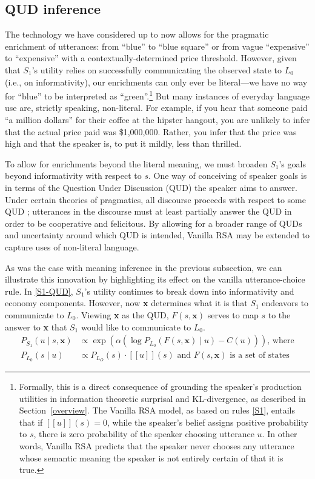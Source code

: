 \documentclass{sp}
\newcommand{\sem}[1]{\ensuremath{[\![#1]\!]}}
\begin{document}
\subsection{QUD inference}

The technology we have considered up to now allows for the pragmatic enrichment of utterances: from ``blue'' to ``blue square'' or from vague ``expensive'' to ``expensive'' with a contextually-determined price threshold. However, given that $S_1$'s utility relies on successfully communicating the observed state to $L_0$ (i.e., on informativity), our enrichments can only ever be literal---we have no way for ``blue'' to be interpreted as ``green''.\footnote{
  Formally, this is a direct consequence of grounding the speaker's production utilities in information theoretic surprisal and KL-divergence, as described in Section~\ref{overview}. The Vanilla RSA model, as based on rules \eqref{S1}, entails that if $\sem{u}(s)=0$, while the speaker's belief assigns positive probability to $s$, there is zero probability of the speaker choosing utterance $u$. In other words, Vanilla RSA predicts that the speaker never chooses any utterance whose semantic meaning the speaker is not entirely certain of that it is true.
}
But many instances of everyday language use are, strictly speaking, non-literal. For example, if you hear that someone paid ``a million dollars'' for their coffee at the hipster hangout, you are unlikely to infer that the actual price paid was \$1,000,000. Rather, you infer that the price was high and that the speaker is, to put it mildly, less than thrilled.

To allow for enrichments beyond the literal meaning, we must broaden $S_1$'s goals beyond informativity with respect to $s$. One way of conceiving of speaker goals is in terms of the Question Under Discussion (QUD) the speaker aims to answer. Under certain theories of pragmatics, all discourse proceeds with respect to some QUD \citep{roberts2012}; utterances in the discourse must at least partially answer the QUD in order to be cooperative and felicitous. By allowing for a broader range of QUDs and uncertainty around which QUD is intended, Vanilla RSA may be extended to capture uses of non-literal language.

As was the case with meaning inference in the previous subsection, we can illustrate this innovation by highlighting its effect on the vanilla utterance-choice rule. In \eqref{S1-QUD}, $S_1$'s utility continues to break down into informativity and economy components. However, now \textbf{x} determines what it is that $S_1$ endeavors to communicate to $L_0$. Viewing \textbf{x} as the QUD, $F(s,\textbf{x})$ serves to map $s$ to the answer to \textbf{x} that $S_1$ would like to communicate to $L_0$.
\begin{align} \label{S1-QUD}
P_{S_1}(u\mid s, \textbf{x}) & \propto \exp (\alpha (\log P_{L_0}(F(s,\textbf{x})\mid u) - C(u)))\text{, where} \\
  P_{L_0}(s \mid u) & \propto P_{L_O}(s)  \cdot \sem{u}(s) \text{ and } F(s,\textbf{x}) \text{ is a set of states} \nonumber
\end{align}
\end{document}
